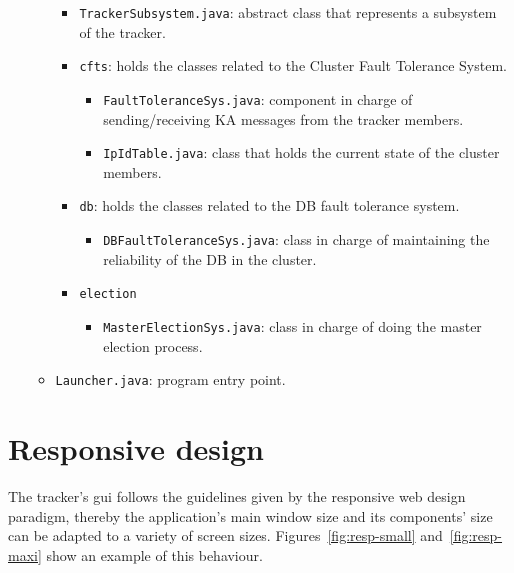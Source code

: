 \documentclass[twoside,a4paper,10pt]{article}
\begin{document}
\begin{itemize}
\begin{itemize}
    \begin{itemize}
    \item \texttt{TrackerSubsystem.java}: abstract class that represents a
      subsystem of the tracker.
    \item \texttt{cfts}: holds the classes related to the Cluster Fault
      Tolerance System.
      \begin{itemize}
      \item \texttt{FaultToleranceSys.java}: component in charge of
        sending/receiving KA messages from the tracker members.
      \item \texttt{IpIdTable.java}: class that holds the current state of the
        cluster members.
      \end{itemize}
    \item \texttt{db}: holds the classes related to the DB fault tolerance
      system.
      \begin{itemize}
      \item \texttt{DBFaultToleranceSys.java}: class in charge of maintaining
        the reliability of the DB in the cluster.
      \end{itemize}
    \item \texttt{election}
      \begin{itemize}
      \item \texttt{MasterElectionSys.java}: class in charge of doing the master
        election process.
      \end{itemize}
    \end{itemize}
  \item \texttt{Launcher.java}: program entry point. 
  \end{itemize}
\end{itemize}

\section{Responsive design}

The tracker's gui follows the guidelines given by the responsive web design
paradigm, thereby the application's main window size and its components' size
can be adapted to a variety of screen sizes.
Figures~\ref{fig:resp-small} and~\ref{fig:resp-maxi} show an example of this
behaviour.
\end{document}
